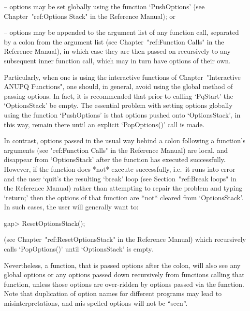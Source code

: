 \item{--} options may be set globally using  the  function  `PushOptions'
(see Chapter~"ref:Options Stack" in the {\GAP} Reference Manual); or

\item{--} options may be appended to the argument list  of  any  function
call,   separated   by   a   colon   from   the   argument   list    (see
Chapter~"ref:Function Calls" in the {\GAP} Reference  Manual),  in  which
case they are then passed on recursively to any subsequent inner function
call, which may in turn have options of their own.

\endlist

Particularly,  when  one  is   using   the   interactive   functions   of
Chapter~"Interactive ANUPQ Functions",  one  should,  in  general,  avoid
using the global method of passing options. In fact,  it  is  recommended
that  prior  to  calling  `PqStart'  the  `OptionsStack'  be  empty.  The
essential problem  with  setting  options  globally  using  the  function
`PushOptions' is that options pushed onto `OptionsStack',  in  this  way,
remain there until an explicit `PopOptions()' call is made.

In contrast, options passed in the usual way behind a colon  following  a
function's arguments (see "ref:Function Calls" in  the  {\GAP}  Reference
Manual) are local, and disappear from `OptionsStack' after  the  function
has executed successfully. However, if the function  does  *not*  execute
successfully, i.e.~it runs into error and the user `quit's the  resulting
`break' loop (see Section~"ref:Break  loops"  in  the  Reference  Manual)
rather than attempting to repair the problem and  typing  `return;'  then
the options of that function are *not* cleared  from  `OptionsStack'.  In
such cases, the user will generally want to:

\begintt
gap> ResetOptionsStack();
\endtt

(see Chapter~"ref:ResetOptionsStack"  in  the  {\GAP}  Reference  Manual)
which recursively calls `PopOptions()' until `OptionsStack' is empty.

Nevertheless, a function, that is passed options after  the  colon,  will
also see any global options or any options passed down  recursively  from
functions calling that function, unless those options are over-ridden  by
options passed via the function. Note that duplication  of  option  names
for different programs may lead to  misinterpretations,  and  mis-spelled
options will not be ``seen''.


